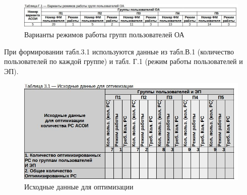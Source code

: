\documentclass[12pt, a4paper, simple]{eskdtext}
\begin{document}
    \begin{figure}[h!]
        \centering
        \includegraphics[width=14cm]
            {_docs/ТаблицаГ1ВариантыРежимовРаботыГруппПользователейОА.jpg}
        \caption{Варианты режимов работы групп пользователей ОА}
    \end{figure}

    При формировании табл.3.1 используются данные из табл.В.1 (количество пользователей по каж­дой группе)
    и табл. Г.1 (режим работы пользователей и ЭП). 

    \begin{figure}[h!]
        \centering
        \includegraphics[width=14cm]
            {_docs/Таблица3-1ИсходныеДанныеДляОптимизации.jpg}
        \caption{Исходные данные для оптимизации}
    \end{figure}
\end{document}

